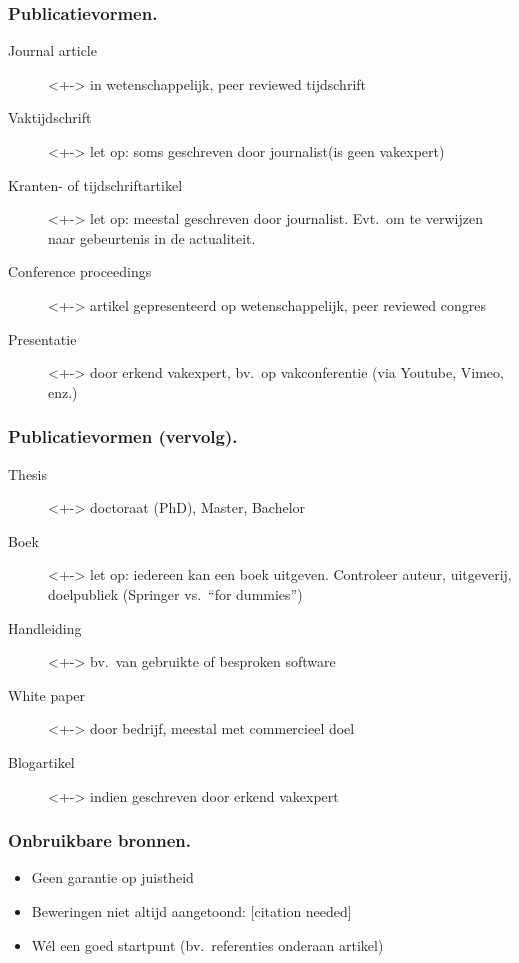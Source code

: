 \documentclass[aspectratio=169]{beamer}
\begin{document}
\begin{frame}
  \frametitle{Publicatievormen.}

  \begin{description}
    \item[Journal article]<+-> in wetenschappelijk, peer reviewed tijdschrift
    \item[Vaktijdschrift]<+-> let op: soms geschreven door journalist\linebreak(is geen vakexpert)
    \item[Kranten- of tijdschriftartikel] <+-> let op: meestal geschreven door journalist. Evt.~om te verwijzen naar gebeurtenis in de actualiteit.
      \item[Conference proceedings]<+-> artikel gepresenteerd op wetenschappelijk, peer reviewed congres
      \item[Presentatie]<+-> door erkend vakexpert, bv.\ op vakconferentie (via Youtube, Vimeo, enz.)
  \end{description}
\end{frame}

\begin{frame}
  \frametitle{Publicatievormen (vervolg).}

  \begin{description}
    \item[Thesis]<+-> doctoraat (PhD), Master, Bachelor
    \item[Boek]<+-> let op: iedereen kan een boek uitgeven. Controleer auteur, uitgeverij, doelpubliek (Springer vs.\ ``for dummies'')
    \item[Handleiding]<+-> bv.\ van gebruikte of besproken software
    \item[White paper]<+-> door bedrijf, meestal met commercieel doel
    \item[Blogartikel]<+-> indien geschreven door erkend vakexpert
  \end{description}
\end{frame}


\begin{frame}
  \frametitle{Onbruikbare bronnen.}


  {\pause}

  \begin{itemize}
    \item Geen garantie op juistheid
    \item Beweringen niet altijd aangetoond: [citation needed]
    \item \alert{Wél} een goed startpunt (bv.\ referenties onderaan artikel)
  \end{itemize}
\end{frame}
\end{document}
